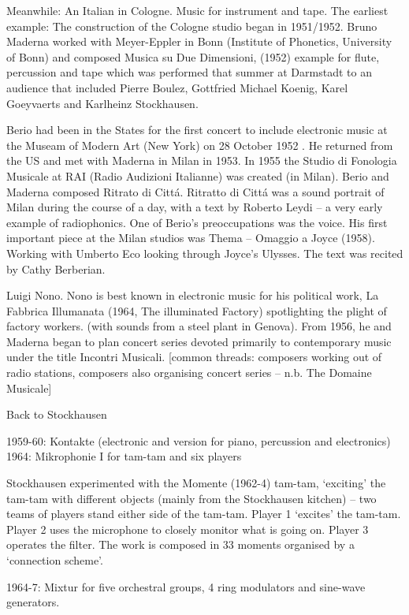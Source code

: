 Meanwhile: An Italian in Cologne. Music for instrument and tape. The earliest example: The construction of the Cologne
studio began in 1951/1952. Bruno Maderna worked with Meyer-Eppler in Bonn (Institute of Phonetics, University of Bonn) and composed Musica su Due Dimensioni, (1952) example for flute, percussion and tape which was performed that summer at Darmstadt to
an audience that included Pierre Boulez, Gottfried Michael Koenig, Karel Goeyvaerts and Karlheinz Stockhausen.

Berio had been in the States for the first concert to include electronic music at the Museam of Modern Art (New York) on 28 October 1952 . He returned from the US and met with Maderna in Milan in 1953. In 1955 the Studio di Fonologia Musicale at RAI
(Radio Audizioni Italianne) was created (in Milan). Berio and Maderna composed Ritrato di Citt\'a. Ritratto di Citt\'a was a sound portrait of Milan during the course of a day, with a text by Roberto Leydi – a very early example of radiophonics. One of Berio’s
preoccupations was the voice. His first important piece at the Milan studios was Thema – Omaggio a Joyce (1958). Working with Umberto Eco looking through Joyce’s Ulysses. The text was recited by Cathy Berberian.

Luigi Nono. Nono is best known in electronic music for his political work, La Fabbrica Illumanata (1964, The illuminated Factory) spotlighting the plight of factory workers. (with sounds from a steel plant in Genova). From 1956, he and Maderna began to plan
concert series devoted primarily to contemporary music under the title Incontri Musicali. [common threads: composers working out of radio stations, composers also organising concert series – n.b. The Domaine Musicale]

Back to Stockhausen

1959-60: Kontakte (electronic and version for piano, percussion and electronics)
1964: Mikrophonie I for tam-tam and six players

Stockhausen experimented with the Momente (1962-4) tam-tam, `exciting' the tam-tam with different objects (mainly from the Stockhausen kitchen) – two teams of players stand either side of the tam-tam. Player 1 `excites' the tam-tam. Player 2 uses the
microphone to closely monitor what is going on. Player 3 operates the filter. The work is composed in 33 moments organised by a `connection scheme'.

1964-7: Mixtur for five orchestral groups, 4 ring modulators and sine-wave generators.

